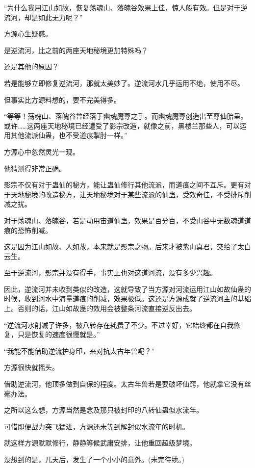 \begin{this_body}
“为什么我用江山如故，恢复荡魂山、落魄谷效果上佳，惊人般有效。但是对于逆流河，却是如此无力呢？”

方源心生疑惑。

是逆流河，比之前的两座天地秘境更加特殊吗？

还是其他的原因？

若是能够立即修复逆流河，那就太美妙了。逆流河水几乎运用不绝，使用不尽。

但事实比方源料想的，要不完美得多。

“等等！荡魂山、落魄谷曾经落于幽魂魔尊之手。而幽魂魔尊创造出至尊仙胎蛊。或许……这两座天地秘境已经遭受了影宗改造，就像之前，黑楼兰那些人，可以运用其他流派仙蛊，也不受道痕掣肘一样。”

方源心中忽然灵光一现。

他猜测得非常正确。

影宗不仅有对于蛊仙的秘方，能让蛊仙修行其他流派，而道痕之间不互斥。更有对于天地秘境的改造秘方，让天地秘境对于某些流派的仙蛊，受效奇佳，不受排斥削减之扰。

对于荡魂山、落魄谷，若是动用宙道仙蛊，效果是百分百，不受山谷中无数魂道道痕的恐怖削减。

这是因为江山如故、人如故，本来就是影宗之物。后来才被紫山真君，交给了太白云生。

至于逆流河，影宗并没有得手，事实上也对这道河流，没有多少兴趣。

因此，逆流河并未收到类似的改造，这就导致了当方源对河流运用江山如故仙蛊的时候，收到河水中海量道痕的削减，效果极低。这还是方源成就了逆流河主的基础上。否则的话，江山如故蛊的效用会被整条河流直接逆反出去。

“逆流河水削减了许多，被八转存在耗费了不少。不过幸好，它始终都在自我修复，只是恢复的速度很慢就是。”

“我能不能借助逆流护身印，来对抗太古年兽呢？”

方源很快就摇头。

借助逆流河，他顶多做到自保的程度。太古年兽若是要破坏仙窍，他就拿它没有丝毫办法。

之所以这么想，方源当然是念及那只被封印的八转仙蛊似水流年。

可惜即便战力突飞猛进，方源还未等到解封似水流年的时机。

就这样方源默默修行，静静等候武庸安排，让他重回超级梦境。

没想到的是，几天后，发生了一个小小的意外。(未完待续。)

\end{this_body}

